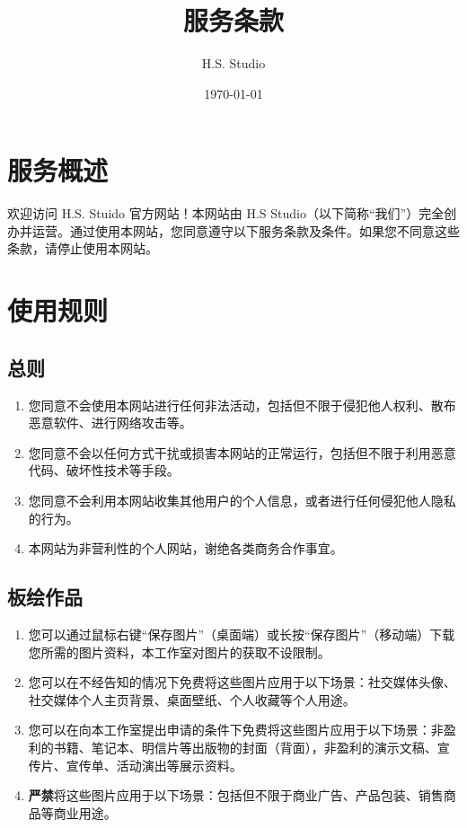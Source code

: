 \documentclass{article}
\title{服务条款}
\author{H.S. Studio}
\date{\today}
\begin{document}
\maketitle

\section*{服务概述}

欢迎访问 H.S. Stuido 官方网站！本网站由 H.S Studio（以下简称“我们”）完全创办并运营。通过使用本网站，您同意遵守以下服务条款及条件。如果您不同意这些条款，请停止使用本网站。

\section{使用规则}

\subsection*{总则}

\begin{enumerate}
    \item 您同意不会使用本网站进行任何非法活动，包括但不限于侵犯他人权利、散布恶意软件、进行网络攻击等。
    \item 您同意不会以任何方式干扰或损害本网站的正常运行，包括但不限于利用恶意代码、破坏性技术等手段。
    \item 您同意不会利用本网站收集其他用户的个人信息，或者进行任何侵犯他人隐私的行为。
    \item 本网站为非营利性的个人网站，谢绝各类商务合作事宜。
\end{enumerate}

\subsection*{板绘作品}

\begin{enumerate}
    \item 您可以通过鼠标右键“保存图片”（桌面端）或长按“保存图片”（移动端）下载您所需的图片资料，本工作室对图片的获取不设限制。
    \item 您可以在不经告知的情况下免费将这些图片应用于以下场景：社交媒体头像、社交媒体个人主页背景、桌面壁纸、个人收藏等个人用途。
    \item 您可以在向本工作室提出申请的条件下免费将这些图片应用于以下场景：非盈利的书籍、笔记本、明信片等出版物的封面（背面），非盈利的演示文稿、宣传片、宣传单、活动演出等展示资料。
    \item \textbf{严禁}将这些图片应用于以下场景：包括但不限于商业广告、产品包装、销售商品等商业用途。
\end{enumerate}
\end{document}
